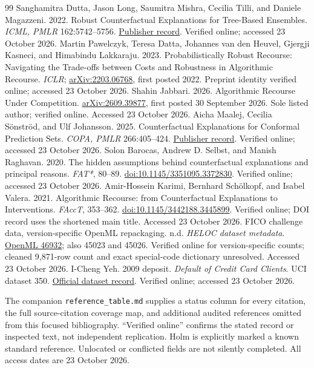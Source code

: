 \begin{thebibliography}{99}
\pbreak
{} Sanghamitra Dutta, Jason Long, Saumitra Mishra, Cecilia Tilli, and Daniele Magazzeni. 2022. Robust Counterfactual Explanations for Tree-Based Ensembles. \emph{ICML, PMLR} 162:5742--5756. \href{https://proceedings.mlr.press/v162/dutta22a.html}{Publisher record}. Verified online; accessed 23 October 2026.
 Martin Pawelczyk, Teresa Datta, Johannes van den Heuvel, Gjergji Kasneci, and Himabindu Lakkaraju. 2023. Probabilistically Robust Recourse: Navigating the Trade-offs between Costs and Robustness in Algorithmic Recourse. \emph{ICLR}; \href{https://arxiv.org/abs/2203.06768}{arXiv:2203.06768}, first posted 2022. Preprint identity verified online; accessed 23 October 2026.
 Shahin Jabbari. 2026. Algorithmic Recourse Under Competition. \href{https://arxiv.org/abs/2609.39877}{arXiv:2609.39877}, first posted 30 September 2026. Sole listed author; verified online. Accessed 23 October 2026.
 Aicha Maalej, Cecilia Sönströd, and Ulf Johansson. 2025. Counterfactual Explanations for Conformal Prediction Sets. \emph{COPA, PMLR} 266:405--424. \href{https://proceedings.mlr.press/v266/maalej25a.html}{Publisher record}. Verified online; accessed 23 October 2026.
 Solon Barocas, Andrew D. Selbst, and Manish Raghavan. 2020. The hidden assumptions behind counterfactual explanations and principal reasons. \emph{FAT*}, 80--89. \href{https://doi.org/10.1145/3351095.3372830}{doi:10.1145/3351095.3372830}. Verified online; accessed 23 October 2026.
 Amir-Hossein Karimi, Bernhard Schölkopf, and Isabel Valera. 2021. Algorithmic Recourse: from Counterfactual Explanations to Interventions. \emph{FAccT}, 353--362. \href{https://doi.org/10.1145/3442188.3445899}{doi:10.1145/3442188.3445899}. Verified online; DOI record uses the shortened main title. Accessed 23 October 2026.
 FICO challenge data, version-specific OpenML repackaging. n.d. \emph{HELOC dataset metadata}. \href{https://www.openml.org/api/v1/json/data/46932}{OpenML 46932}; also 45023 and 45026. Verified online for version-specific counts; cleaned 9,871-row count and exact special-code dictionary unresolved. Accessed 23 October 2026.
 I-Cheng Yeh. 2009 deposit. \emph{Default of Credit Card Clients}. UCI dataset 350. \href{https://archive.ics.uci.edu/dataset/350/default+of+credit+card+clients}{Official dataset record}. Verified online; accessed 23 October 2026.
\end{thebibliography}
\endgroup
\small{} The companion \texttt{reference\_table.md} supplies a status column for every citation, the full source-citation coverage map, and additional audited references omitted from this focused bibliography. “Verified online” confirms the stated record or inspected text, not independent replication. Holm is explicitly marked a known standard reference. Unlocated or conflicted fields are not silently completed. All access dates are 23 October 2026.
\normalsize

